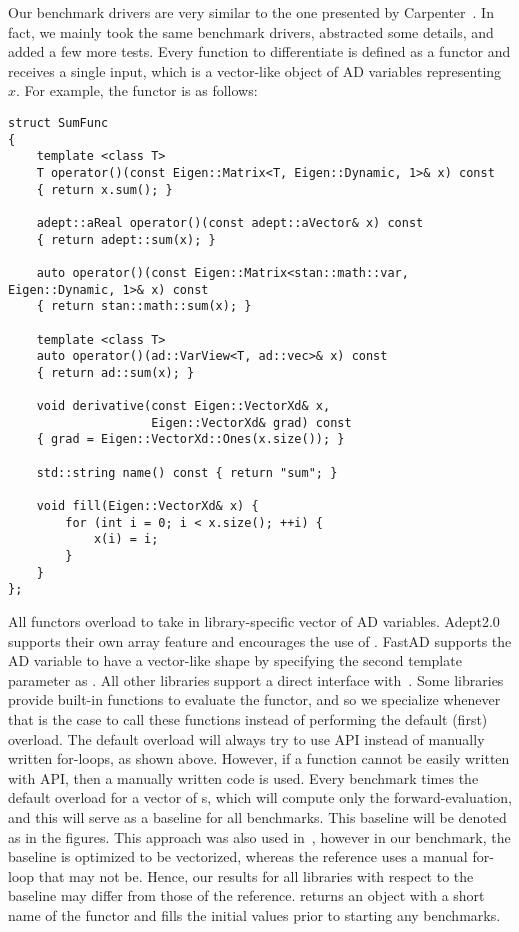 Our benchmark drivers are very similar to the one presented by Carpenter~\cite{carpenter:2015}.
In fact, we mainly took the same benchmark drivers, abstracted some details, and added a few more tests.
Every function to differentiate is defined as a functor and receives a single input,
which is a vector-like object of AD variables representing $x$.
For example, the  functor is as follows:
\begin{lstlisting}[style=customcpp]
struct SumFunc
{
    template <class T>
    T operator()(const Eigen::Matrix<T, Eigen::Dynamic, 1>& x) const
    { return x.sum(); }

    adept::aReal operator()(const adept::aVector& x) const
    { return adept::sum(x); }

    auto operator()(const Eigen::Matrix<stan::math::var, Eigen::Dynamic, 1>& x) const
    { return stan::math::sum(x); }

    template <class T>
    auto operator()(ad::VarView<T, ad::vec>& x) const
    { return ad::sum(x); }

    void derivative(const Eigen::VectorXd& x,
                    Eigen::VectorXd& grad) const
    { grad = Eigen::VectorXd::Ones(x.size()); }

    std::string name() const { return "sum"; }

    void fill(Eigen::VectorXd& x) {
        for (int i = 0; i < x.size(); ++i) {
            x(i) = i;
        }
    }
};
\end{lstlisting}
All functors overload  to take in library-specific vector of AD variables.
Adept2.0 supports their own array feature and encourages the use of .
FastAD supports the AD variable to have a vector-like shape by specifying the second template parameter as .
All other libraries support a direct interface with~.
Some libraries provide built-in functions to evaluate the functor, and so we specialize whenever that is the case
to call these functions instead of performing the default (first) overload.
The default overload will always try to use  API instead of manually written for-loops, as shown above.
However, if a function cannot be easily written with  API, then a manually written code is used.
Every benchmark times the default overload for a vector of s,
which will compute only the forward-evaluation, and this will serve as a baseline for all benchmarks.
This baseline will be denoted as  in the figures.
This approach was also used in~\cite{carpenter:2015},
however in our benchmark, the baseline is optimized to be vectorized,
whereas the reference uses a manual for-loop that may not be.
Hence, our results for all libraries with respect to the baseline may differ from those of the reference.
 returns an  object with a short name of the functor
and  fills the initial values prior to starting any benchmarks. 

